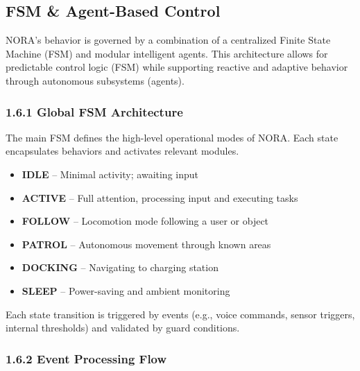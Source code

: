 \subsection*{FSM \& Agent-Based Control}


NORA's behavior is governed by a combination of a centralized Finite State Machine (FSM) and modular intelligent agents. This architecture allows for predictable control logic (FSM) while supporting reactive and adaptive behavior through autonomous subsystems (agents).

\vspace{0.5cm}

\subsubsection*{1.6.1 Global FSM Architecture}

The main FSM defines the high-level operational modes of NORA. Each state encapsulates behaviors and activates relevant modules.

\begin{itemize}
    \item \textbf{IDLE} -- Minimal activity; awaiting input
    \item \textbf{ACTIVE} -- Full attention, processing input and executing tasks
    \item \textbf{FOLLOW} -- Locomotion mode following a user or object
    \item \textbf{PATROL} -- Autonomous movement through known areas
    \item \textbf{DOCKING} -- Navigating to charging station
    \item \textbf{SLEEP} -- Power-saving and ambient monitoring
\end{itemize}

Each state transition is triggered by events (e.g., voice commands, sensor triggers, internal thresholds) and validated by guard conditions.

\vspace{0.5cm}

\subsubsection*{1.6.2 Event Processing Flow}


